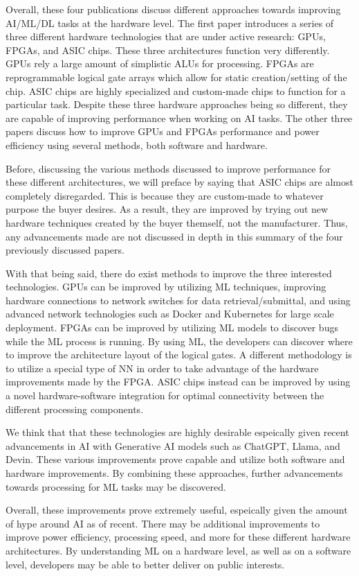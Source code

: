 Overall, these four publications discuss different approaches towards improving AI/ML/DL tasks at the hardware level.
The first paper introduces a series of three different hardware technologies that are under active research: GPUs, FPGAs, and ASIC chips.
These three architectures function very differently.
GPUs rely a large amount of simplistic ALUs for processing.
FPGAs are reprogrammable logical gate arrays which allow for static creation/setting of the chip.
ASIC chips are highly specialized and custom-made chips to function for a particular task.
Despite these three hardware approaches being so different, they are capable of improving performance when working on AI tasks.
The other three papers discuss how to improve GPUs and FPGAs performance and power efficiency using several methods, both software and hardware.

Before, discussing the various methods discussed to improve performance for these different architectures, we will preface by saying that ASIC chips are almost completely disregarded.
This is because they are custom-made to whatever purpose the buyer desires.
As a result, they are improved by trying out new hardware techniques created by the buyer themself, not the manufacturer.
Thus, any advancements made are not discussed in depth in this summary of the four previously discussed papers.

With that being said, there do exist methods to improve the three interested technologies.
GPUs can be improved by utilizing ML techniques, improving hardware connections to network switches for data retrieval/submittal, and using advanced network technologies such as Docker and Kubernetes for large scale deployment.
FPGAs can be improved by utilizing ML models to discover bugs while the ML process is running.
By using ML, the developers can discover where to improve the architecture layout of the logical gates.
A different methodology is to utilize a special type of NN in order to take advantage of the hardware improvements made by the FPGA.
ASIC chips instead can be improved by using a novel hardware-software integration for optimal connectivity between the different processing components.

We think that that these technologies are highly desirable espeically given recent advancements in AI with Generative AI models such as ChatGPT, Llama, and Devin.
These various improvements prove capable and utilize both software and hardware improvements.
By combining these approaches, further advancements towards processing for ML tasks may be discovered.

Overall, these improvements prove extremely useful, espeically given the amount of hype around AI as of recent.
There may be additional improvements to improve power efficiency, processing speed, and more for these different hardware architectures.
By understanding ML on a hardware level, as well as on a software level, developers may be able to better deliver on public interests.